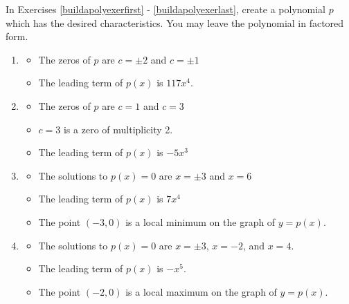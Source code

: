 In Exercises \ref{buildapolyexerfirst} - \ref{buildapolyexerlast}, create a polynomial $p$ which has the desired characteristics.  You may leave the polynomial in factored form. 

\begin{enumerate}
\setcounter{enumi}{\value{HW}}

\item \label{buildapolyexerfirst}

\begin{itemize}

\item The zeros of $p$ are $c = \pm 2$ and $c = \pm 1$
\item The leading term of $p(x)$ is $117x^4$.

\end{itemize}

\item

\begin{itemize}

\item The zeros of $p$ are $c=1$ and $c = 3$
\item $c=3$ is a zero of multiplicity 2.
\item The leading term of $p(x)$ is $-5x^3$

\end{itemize}

\item

\begin{itemize}

\item The solutions to $p(x) = 0$ are $x = \pm 3$ and $x=6$
\item The leading term of $p(x)$ is $7x^4$
\item The point $(-3,0)$ is a local minimum on the graph of $y=p(x)$.

\end{itemize}


\item

\begin{itemize}

\item The solutions to $p(x) =0$ are $x = \pm 3$, $x=-2$, and $x=4$.
\item The leading term of $p(x)$ is $-x^5$.
\item The point $(-2, 0)$ is a local maximum on the graph of $y=p(x)$.

\end{itemize}


\end{enumerate}
